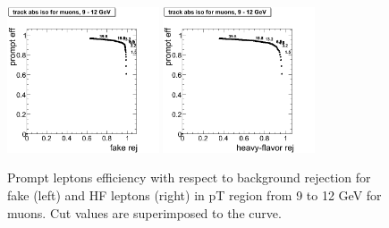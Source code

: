 \begin{figure}[htbp]
\begin{center}

 \includegraphics[width = 0.4\textwidth]{pictures/bkgdRej_sigEff/onlyTrack_muon_fake_ptCut2_ptCut3.png}
\includegraphics[width = 0.4\textwidth]{pictures/bkgdRej_sigEff/onlyTrack_muon_nonPrompt_ptCut2_ptCut3.png}
\caption{\small{Prompt leptons efficiency with respect to background 
rejection for fake (left) and HF leptons (right) in pT region
from 9 to 12 GeV for muons. 
Cut values are superimposed to the curve.}\label{fig:rej_mu3}}
\end{center}
\end{figure}

